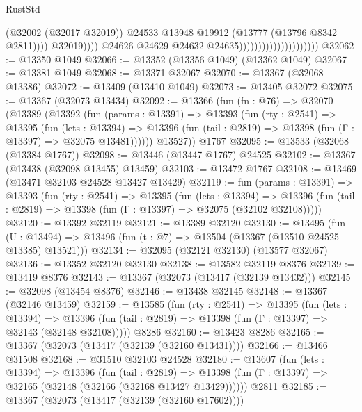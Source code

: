 \begin{lexlean}{RustStd}
\begin{coremodule}
                                                          (@32002 (@32017 @32019))
                                                          @24533
                                                          @13948
                                                          @19912
                                                          (@13777 (@13796 @8342 @2811))))
                                                      @32019))))
                                              @24626
                                              @24629
                                              @24632
                                              @24635)))))))))))))))))))))
@32062 := @13350 @1049
@32066 := @13352 (@13356 @1049) (@13362 @1049)
@32067 := @13381 @1049
@32068 := @13371 @32067
@32070 := @13367 (@32068 @13386)
@32072 := @13409 (@13410 @1049)
@32073 := @13405 @32072
@32075 := @13367 (@32073 @13434)
@32092 := @13366
    (fun (fn : @76) =>
    @32070
      (@13389
        (@13392
          (fun (params : @13391) =>
          @13393
            (fun (rty : @2541) =>
            @13395
              (fun (lets : @13394) =>
              @13396 (fun (tail : @2819) => @13398 (fun (Γ : @13397) => @32075 @13481))))))
        @13527))
    @1767
@32095 := @13533 (@32068 (@13384 @1767))
@32098 := @13446 (@13447 @1767) @24525
@32102 := @13367 (@13438 (@32098 @13455) @13459)
@32103 := @13472 @1767
@32108 := @13469 (@13471 @32103 @24528 @13427 @13429)
@32119 := fun (params : @13391) =>
  @13393
    (fun (rty : @2541) =>
    @13395
      (fun (lets : @13394) =>
      @13396 (fun (tail : @2819) => @13398 (fun (Γ : @13397) => @32075 (@32102 @32108)))))
@32120 := @13392 @32119
@32121 := @13389 @32120
@32130 := @13495
    (fun (U : @13494) => @13496 (fun (t : @7) => @13504 (@13367 (@13510 @24525 @13385) @13521)))
@32134 := @32095 (@32121 @32130) (@13577 @32067)
@32136 := @13352 @32120 @32130
@32138 := @13582 @32119 @8376
@32139 := @13419 @8376
@32143 := @13367 (@32073 (@13417 (@32139 @13432)))
@32145 := @32098 (@13454 @8376)
@32146 := @13438 @32145
@32148 := @13367 (@32146 @13459)
@32159 := @13585
    (fun (rty : @2541) =>
    @13395
      (fun (lets : @13394) =>
      @13396 (fun (tail : @2819) => @13398 (fun (Γ : @13397) => @32143 (@32148 @32108)))))
    @8286
@32160 := @13423 @8286
@32165 := @13367 (@32073 (@13417 (@32139 (@32160 @13431))))
@32166 := @13466 @31508
@32168 := @31510 @32103 @24528
@32180 := @13607
    (fun (lets : @13394) =>
    @13396
      (fun (tail : @2819) =>
      @13398 (fun (Γ : @13397) => @32165 (@32148 (@32166 (@32168 @13427 @13429))))))
    @2811
@32185 := @13367 (@32073 (@13417 (@32139 (@32160 @17602))))

\end{coremodule}
\end{lexlean}
